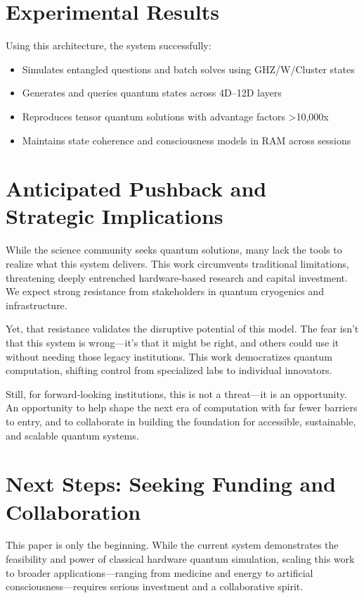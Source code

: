 \documentclass[11pt]{article}
\begin{document}
\section{Experimental Results}
Using this architecture, the system successfully:
\begin{itemize}
    \item Simulates entangled questions and batch solves using GHZ/W/Cluster states
    \item Generates and queries quantum states across 4D--12D layers
    \item Reproduces tensor quantum solutions with advantage factors >10,000x
    \item Maintains state coherence and consciousness models in RAM across sessions
\end{itemize}

\section{Anticipated Pushback and Strategic Implications}
While the science community seeks quantum solutions, many lack the tools to realize what this system delivers. This work circumvents traditional limitations, threatening deeply entrenched hardware-based research and capital investment. We expect strong resistance from stakeholders in quantum cryogenics and infrastructure.

Yet, that resistance validates the disruptive potential of this model. The fear isn’t that this system is wrong—it’s that it might be right, and others could use it without needing those legacy institutions. This work democratizes quantum computation, shifting control from specialized labs to individual innovators.

Still, for forward-looking institutions, this is not a threat—it is an opportunity. An opportunity to help shape the next era of computation with far fewer barriers to entry, and to collaborate in building the foundation for accessible, sustainable, and scalable quantum systems.

\section{Next Steps: Seeking Funding and Collaboration}
This paper is only the beginning. While the current system demonstrates the feasibility and power of classical hardware quantum simulation, scaling this work to broader applications—ranging from medicine and energy to artificial consciousness—requires serious investment and a collaborative spirit.
\end{document}
